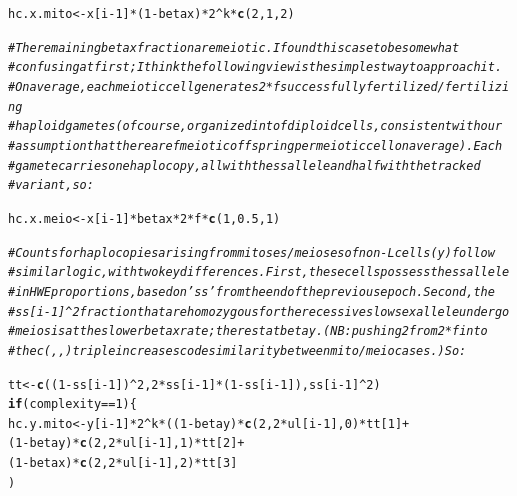 \documentclass{article}\usepackage[]{graphicx}\usepackage[]{color}
\makeatletter
\newcommand{\hlnum}[1]{\textcolor[rgb]{0.686,0.059,0.569}{#1}}%
\newcommand{\hlcom}[1]{\textcolor[rgb]{0.678,0.584,0.686}{\textit{#1}}}%
\newcommand{\hlopt}[1]{\textcolor[rgb]{0,0,0}{#1}}%
\newcommand{\hlstd}[1]{\textcolor[rgb]{0.345,0.345,0.345}{#1}}%
\newcommand{\hlkwa}[1]{\textcolor[rgb]{0.161,0.373,0.58}{\textbf{#1}}}%
\newcommand{\hlkwb}[1]{\textcolor[rgb]{0.69,0.353,0.396}{#1}}%
\newcommand{\hlkwd}[1]{\textcolor[rgb]{0.737,0.353,0.396}{\textbf{#1}}}%
\newenvironment{kframe}{%
 \def\at@end@of@kframe{}%
 \ifinner\ifhmode%
  \def\at@end@of@kframe{\end{minipage}}%
  \begin{minipage}{\columnwidth}%
 \fi\fi%
 \def\FrameCommand##1{\hskip\@totalleftmargin \hskip-\fboxsep
 \colorbox{shadecolor}{##1}\hskip-\fboxsep
     \hskip-\linewidth \hskip-\@totalleftmargin \hskip\columnwidth}%
 \MakeFramed {\advance\hsize-\width
   \@totalleftmargin\z@ \linewidth\hsize
   \@setminipage}}%
 {\par\unskip\endMakeFramed%
 \at@end@of@kframe}
\newenvironment{knitrout}{}{} %
\makeatother
\begin{document}
\begin{knitrout}
\begin{kframe}
\begin{alltt}
    \hlstd{hc.x.mito} \hlkwb{<-} \hlstd{x[i}\hlopt{-}\hlnum{1}\hlstd{]} \hlopt{*} \hlstd{(}\hlnum{1}\hlopt{-}\hlstd{betax)} \hlopt{*} \hlnum{2}\hlopt{^}\hlstd{k} \hlopt{*} \hlkwd{c}\hlstd{(}\hlnum{2}\hlstd{,} \hlnum{1}\hlstd{,} \hlnum{2}\hlstd{)}

    \hlcom{# The remaining betax fraction are meiotic.  I found this case to be somewhat}
    \hlcom{# confusing at first; I think the following view is the simplest way to approach it. }
    \hlcom{# On average, each meiotic cell generates 2*f successfully fertilized/fertilizing}
    \hlcom{# haploid gametes (of course, organized into f diploid cells, consistent with our}
    \hlcom{# assumption that there are f meiotic offspring per meiotic cell on average).  Each}
    \hlcom{# gamete carries one haplocopy, all with the ss allele and half with the tracked}
    \hlcom{# variant, so:}

    \hlstd{hc.x.meio} \hlkwb{<-} \hlstd{x[i}\hlopt{-}\hlnum{1}\hlstd{]} \hlopt{*}    \hlstd{betax}  \hlopt{*} \hlnum{2}\hlopt{*}\hlstd{f} \hlopt{*} \hlkwd{c}\hlstd{(}\hlnum{1}\hlstd{,} \hlnum{0.5}\hlstd{,} \hlnum{1}\hlstd{)}

    \hlcom{# Counts for haplocopies arising from mitoses/meioses of non-L cells (y) follow}
    \hlcom{# similar logic, with two key differences.  First, these cells possess the ss allele}
    \hlcom{# in HWE proportions, based on 'ss' from the end of the previous epoch.  Second, the}
    \hlcom{# ss[i-1]^2 fraction that are homozygous for the recessive slow sex allele undergo}
    \hlcom{# meiosis at the slower betax rate; the rest at betay.  (NB: pushing 2 from 2*f into}
    \hlcom{# the c(,,) triple increases code similarity between mito/meio cases.) So:}

    \hlstd{tt} \hlkwb{<-} \hlkwd{c}\hlstd{((}\hlnum{1}\hlopt{-}\hlstd{ss[i}\hlopt{-}\hlnum{1}\hlstd{])}\hlopt{^}\hlnum{2}\hlstd{,} \hlnum{2}\hlopt{*}\hlstd{ss[i}\hlopt{-}\hlnum{1}\hlstd{]}\hlopt{*}\hlstd{(}\hlnum{1}\hlopt{-}\hlstd{ss[i}\hlopt{-}\hlnum{1}\hlstd{]), ss[i}\hlopt{-}\hlnum{1}\hlstd{]}\hlopt{^}\hlnum{2}\hlstd{)}
    \hlkwa{if}\hlstd{(complexity} \hlopt{==} \hlnum{1}\hlstd{)\{}
      \hlstd{hc.y.mito} \hlkwb{<-} \hlstd{y[i}\hlopt{-}\hlnum{1}\hlstd{]} \hlopt{*} \hlnum{2}\hlopt{^}\hlstd{k} \hlopt{*} \hlstd{((}\hlnum{1}\hlopt{-}\hlstd{betay)} \hlopt{*} \hlkwd{c}\hlstd{(}\hlnum{2}\hlstd{,} \hlnum{2}\hlopt{*}\hlstd{ul[i}\hlopt{-}\hlnum{1}\hlstd{],} \hlnum{0}\hlstd{)} \hlopt{*} \hlstd{tt[}\hlnum{1}\hlstd{]} \hlopt{+}
                                   \hlstd{(}\hlnum{1}\hlopt{-}\hlstd{betay)} \hlopt{*} \hlkwd{c}\hlstd{(}\hlnum{2}\hlstd{,} \hlnum{2}\hlopt{*}\hlstd{ul[i}\hlopt{-}\hlnum{1}\hlstd{],} \hlnum{1}\hlstd{)} \hlopt{*} \hlstd{tt[}\hlnum{2}\hlstd{]} \hlopt{+}
                                   \hlstd{(}\hlnum{1}\hlopt{-}\hlstd{betax)} \hlopt{*} \hlkwd{c}\hlstd{(}\hlnum{2}\hlstd{,} \hlnum{2}\hlopt{*}\hlstd{ul[i}\hlopt{-}\hlnum{1}\hlstd{],} \hlnum{2}\hlstd{)} \hlopt{*} \hlstd{tt[}\hlnum{3}\hlstd{]}
                                  \hlstd{)}


\end{alltt}
\end{kframe}
\end{knitrout}
\end{document}
